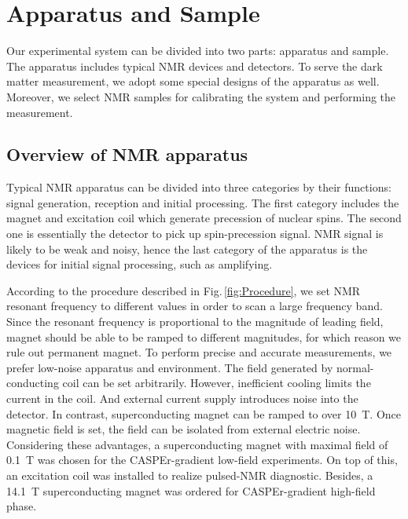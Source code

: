 









\chapter{Apparatus and Sample}

Our experimental system can be divided into two parts: apparatus and sample. The apparatus includes typical NMR devices and detectors. 
To serve the dark matter measurement, we adopt some special designs of the apparatus as well. Moreover, we select NMR samples for calibrating the system and performing the measurement. 

\section{Overview of NMR apparatus}

Typical NMR apparatus can be divided into three categories by their functions: signal generation, reception and initial processing. The first category includes the magnet and excitation coil which generate precession of nuclear spins. The second one is essentially the detector to pick up spin-precession signal. NMR signal is likely to be weak and noisy, hence the last category of the apparatus is the devices for initial signal processing, such as amplifying. 

According to the procedure described in Fig.\,\ref{fig:Procedure}, we set NMR resonant frequency to different values in order to scan a large frequency band. Since the resonant frequency is proportional to the magnitude of leading field, magnet should be able to be ramped to different magnitudes, for which reason we rule out permanent magnet. 
To perform precise and accurate measurements, we prefer low-noise apparatus and environment. The field generated by normal-conducting coil can be set arbitrarily. However, inefficient cooling limits the current in the coil. And external current supply introduces noise into the detector. In contrast, superconducting magnet can be ramped to over \SI{10}{\tesla}. Once magnetic field is set, the field can be isolated from external electric noise. Considering these advantages, a superconducting magnet with maximal field of \SI{0.1}{\tesla} was chosen for the CASPEr-gradient low-field experiments.
On top of this, an excitation coil was installed to realize pulsed-NMR diagnostic. 
Besides, a \SI{14.1}{\tesla} superconducting magnet was ordered for CASPEr-gradient high-field phase.  

